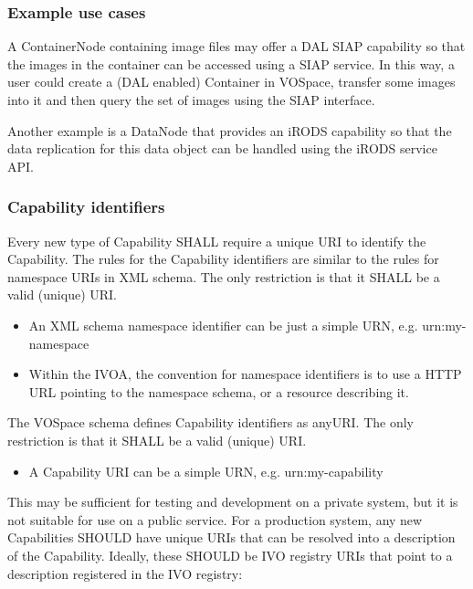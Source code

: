 \documentclass[11pt,a4paper]{ivoa}
\begin{document}
\subsubsection{Example use cases}
\label{subsubsec:example use cases}
A ContainerNode containing image files may offer a DAL SIAP capability so that the images in the container can be accessed using a SIAP service. In this way, a user could create a (DAL enabled) Container in VOSpace, transfer some images into it and then query the set of images using the SIAP interface.

Another example is a DataNode that provides an iRODS capability so that the data replication for this data object can be handled using the iRODS service API.

\subsubsection{Capability identifiers}
\label{subsubsec:capability identifiers}
Every new type of Capability SHALL require a unique URI to identify the Capability. The rules for the Capability identifiers are similar to the rules for namespace URIs in XML schema. The only restriction is that it SHALL be a valid (unique) URI.

\begin{itemize}
    \item An XML schema namespace identifier can be just a simple URN, e.g. urn:my-namespace
    \item Within the IVOA, the convention for namespace identifiers is to use a HTTP URL pointing to the namespace schema, or a resource describing it.
\end{itemize}

The VOSpace schema defines Capability identifiers as anyURI. The only restriction is that it SHALL be a valid (unique) URI.

\begin{itemize}
    \item A Capability URI can be a simple URN, e.g. urn:my-capability
\end{itemize}

This may be sufficient for testing and development on a private system, but it is not suitable for use on a public service. For a production system, any new Capabilities SHOULD have unique URIs that can be resolved into a description of the Capability. Ideally, these SHOULD be IVO registry URIs that point to a description registered in the IVO registry:
\end{document}
